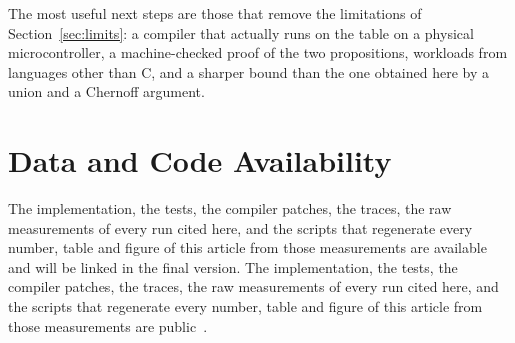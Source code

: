 The most useful next steps are those that remove the limitations of Section~\ref{sec:limits}: a compiler that actually runs on the table on a physical microcontroller, a machine-checked proof of the two propositions, workloads from languages other than C, and a sharper bound than the one obtained here by a union and a Chernoff argument.

\section*{Data and Code Availability}
\ifdefined\anonymous
The implementation, the tests, the compiler patches, the traces, the raw measurements of every run cited here, and the scripts that regenerate every number, table and figure of this article from those measurements are available and will be linked in the final version.
\else
The implementation, the tests, the compiler patches, the traces, the raw measurements of every run cited here, and the scripts that regenerate every number, table and figure of this article from those measurements are public~\cite{strata}.
\fi

